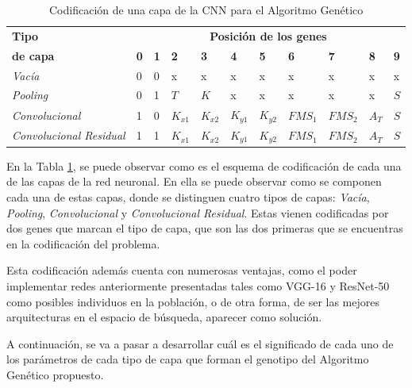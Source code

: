 \begin{table}[h]
\caption{Codificación de una capa de la CNN para el Algoritmo Genético}
\label{tab:codificacion}
\centering
\begin{tabular}{l|llllllllll}
\toprule
\textbf{Tipo}               & \multicolumn{10}{c}{\textbf{Posición de los genes}}                         \\
\textbf{de capa}            & \textbf{0} & \textbf{1} & \textbf{2}     & \textbf{3}     & \textbf{4}     & \textbf{5}     & \textbf{6}      & \textbf{7}      & \textbf{8}    & \textbf{9} \\ \hline
\textit{Vacía}              & 0 & 0 & x     & x     & x     & x     & x      & x      & x    & x \\
\textit{Pooling}            & 0 & 1 & $T$     & $K$     & x     & x     & x      & x      & x    & $S$ \\
\textit{Convolucional}        & 1 & 0 & $K_{x1}$ & $K_{x2}$ & $K_{y1}$ & $K_{y2}$ & $FMS_1$ & $FMS_2$ & $A_T$ & $S$ \\
\textit{Convolucional Residual} & 1 & 1 & $K_{x1}$ & $K_{x2}$ & $K_{y1}$ & $K_{y2}$ & $FMS_1$ & $FMS_2$ & $A_T$ & $S$ \\
\bottomrule
\end{tabular}
\end{table}

En la Tabla \ref{tab:codificacion}, se puede observar como es el esquema de codificación de cada una de las capas de la red neuronal. En ella se puede observar como se componen cada una de estas capas, donde se distinguen cuatro tipos de capas: \textit{Vacía}, \textit{Pooling}, \textit{Convolucional} y \textit{Convolucional Residual}. Estas vienen codificadas por dos genes que marcan el tipo de capa, que son las dos primeras que se encuentras en la codificación del problema.

Esta codificación además cuenta con numerosas ventajas, como el poder implementar redes anteriormente presentadas tales como VGG-16 y ResNet-50 como posibles individuos en la población, o de otra forma, de ser las mejores arquitecturas en el espacio de búsqueda, aparecer como solución.

A continuación, se va a pasar a desarrollar cuál es el significado de cada uno de los parámetros de cada tipo de capa que forman el genotipo del Algoritmo Genético propuesto.

